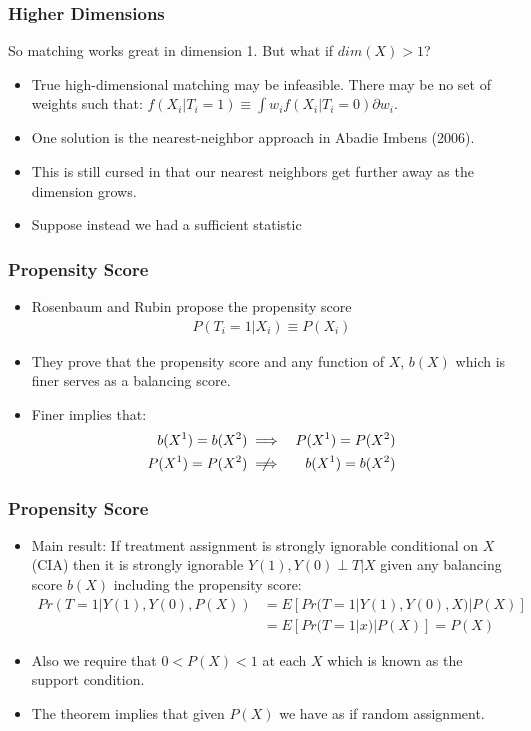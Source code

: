 \documentclass[xcolor=pdftex,dvipsnames,table,mathserif]{beamer}
\begin{document}
\begin{frame}
\frametitle{Higher Dimensions}
So matching works great in dimension 1. But what if $dim(X) > 1$?
\begin{itemize}
\item True high-dimensional matching may be infeasible. There may be no set of weights such that:
$f(X_i | T_i=1) \equiv \int w_i f(X_i | T_i=0) \partial w_i $.
\item One solution is the nearest-neighbor approach in Abadie Imbens (2006).
\item This is still cursed in that our nearest neighbors get further away as the dimension grows.
\item Suppose instead we had a \alert{sufficient statistic}
\end{itemize}
\end{frame}

\begin{frame}
\frametitle{Propensity Score}
\begin{itemize}
\item Rosenbaum and Rubin propose the \alert{propensity score}
\begin{eqnarray*}
P(T_i  = 1 | X_i) \equiv P(X_i)
\end{eqnarray*}
\item They prove that the propensity score and any function of $X$, $b(X)$ which is finer serves as a \alert{balancing score}.
\item Finer implies that:
\begin{eqnarray*}
b(X^1) = b(X^2) &\implies& P(X^1) = P(X^2)\\
P(X^1) = P(X^2) & \centernot \implies & b(X^1) = b(X^2)
\end{eqnarray*}
\end{itemize}
\end{frame}


\begin{frame}
\frametitle{Propensity Score}
\begin{itemize}
\item Main result: If treatment assignment is strongly ignorable conditional on $X$ (CIA) then it is strongly ignorable $Y(1),Y(0) \perp T | X$ given any balancing score $b(X)$ including the propensity score:
\begin{align*}
Pr(T=1 | Y(1), Y(0),P(X))&= E[Pr(T=1| Y(1),Y(0),X) | P(X)] \\
&= E[Pr(T=1 | x) | P(X) ] = P(X)
\end{align*}
\item Also we require that $0 < P(X) < 1$ at each $X$ which is known as the \alert{support condition}.
\item The theorem implies that given $P(X)$ we have as if random assignment.
\end{itemize}
\end{frame}
\end{document}
